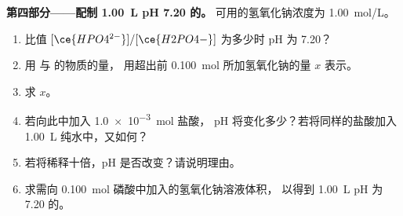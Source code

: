 \begin{problem}
\medskip
\noindent\textbf{第四部分——配制 \qty{1.00}{L} pH 7.20 的。}
可用的氢氧化钠浓度为 \qty{1.00}{mol/L}。
\begin{enumerate}[resume]
  \item 比值 $[\ce{HPO4^{2-}}]/[\ce{H2PO4-}]$ 为多少时 pH 为 7.20？
  \item 用  与  的物质的量，
        用超出前 \qty{0.100}{mol} 所加氢氧化钠的量 $x$ 表示。
  \item 求 $x$。
  \item 若向此中加入 \qty{1.0e-3}{mol} 盐酸，
        pH 将变化多少？若将同样的盐酸加入 \qty{1.00}{L} 纯水中，又如何？
  \item 若将稀释十倍，pH 是否改变？请说明理由。
  \item 求需向 \qty{0.100}{mol} 磷酸中加入的氢氧化钠溶液体积，
        以得到 \qty{1.00}{L}
        pH 为 7.20 的。
\end{enumerate}
\end{problem}
